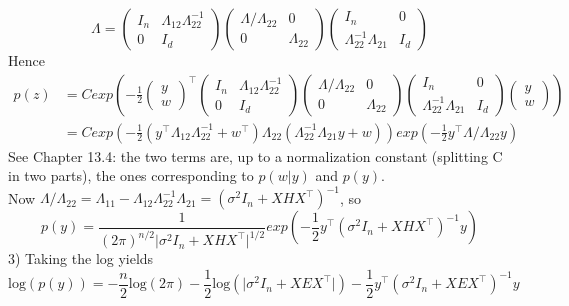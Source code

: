 \documentclass[11pt,a4paper]{article}
\begin{document}
$$\Lambda = 
\begin{pmatrix}I_n &\Lambda_{12}\Lambda_{22}^{-1} \\ 0  &I_d\end{pmatrix}
\begin{pmatrix} \Lambda / \Lambda_{22} & 0 \\ 0 &  \Lambda_{22} \end{pmatrix}
\begin{pmatrix}I_n &0\\ \Lambda_{22}^{-1} \Lambda_{21}  &I_d\end{pmatrix}
$$
Hence $$\begin{aligned}p(z) &= C exp (-\frac{1}{2} \begin{pmatrix} y \\ w \end{pmatrix}^{\top} 
\begin{pmatrix}I_n &\Lambda_{12}\Lambda_{22}^{-1} \\ 0  &I_d\end{pmatrix}
\begin{pmatrix} \Lambda / \Lambda_{22} & 0 \\ 0 &  \Lambda_{22} \end{pmatrix}
\begin{pmatrix}I_n &0\\ \Lambda_{22}^{-1} \Lambda_{21}  &I_d\end{pmatrix}
\begin{pmatrix} y \\ w \end{pmatrix})
%
\\&= C exp \left( - \frac{1}{2} ( y^{\top} \Lambda_{12} \Lambda_{22}^{-1} + w^{\top})\Lambda_{22}(\Lambda_{22}^{-1}\Lambda_{21}y + w ) \right) exp(-\frac{1}{2} y^{\top} \Lambda/\Lambda_{22} y)
\end{aligned}
$$
See Chapter 13.4: the two terms are, up to a normalization constant (splitting C in two parts), the ones corresponding to $p(w\vert y)$ and $p(y)$.
%
\\Now $ \Lambda/\Lambda_{22} = \Lambda_{11} - \Lambda_{12}\Lambda_{22}^{-1} \Lambda_{21} = (\sigma^2 I_n + X H X^{\top})^{-1}$, so 
$$p(y) = \frac{1}{(2 \pi)^{n/2}\vert  \sigma^2 I_n + X H X^{\top} \vert ^{1/2}} exp (-\frac{1}{2} y^{\top}  (\sigma^2 I_n + X H X^{\top})^{-1} y)$$
%
\vspace{5mm}3) Taking the log yields 
$$\mathrm{log}(p(y)) = -\frac{n}{2} \mathrm{log} (2 \pi) - \frac{1}{2} \mathrm{log} ( \vert \sigma^2 I_n +X E X^{\top} \vert ) - \frac{1}{2} y^{\top} (\sigma^2  I_n +X E X^{\top} )^{-1} y $$
\end{document}
